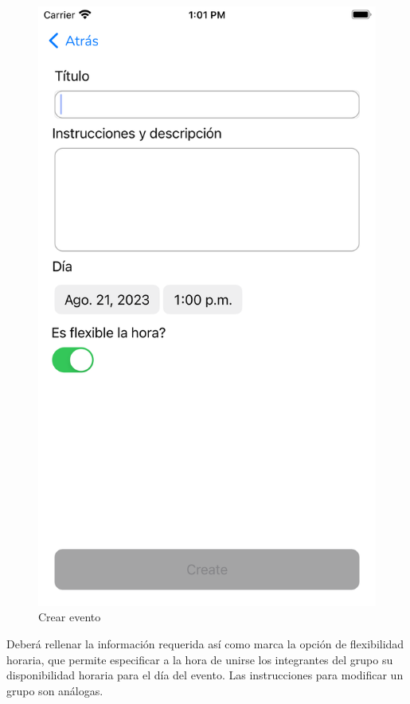 \begin{appendices}
\begin{figure}[H]
\begin{minipage}{0.3\textwidth}
        \end{minipage}
        \begin{minipage}{0.3\textwidth}
            \centering
            \includegraphics[cframe=black 2pt,width=1\linewidth]{images/manual/crearEventoFormulario.png}
        \end{minipage}
        \caption{Crear evento}
        \label{fig:create_event}
\end{figure}
Deberá rellenar la información requerida así como marca la opción de flexibilidad horaria, que permite especificar a la hora de unirse los integrantes del grupo su disponibilidad horaria para el día del evento.
Las instrucciones para modificar un grupo son análogas.

\end{appendices}

